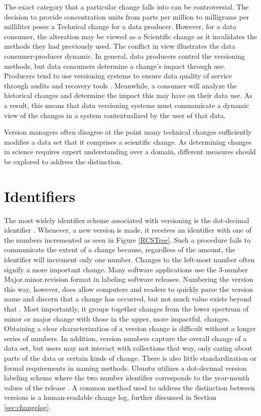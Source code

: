 The exact category that a particular change falls into can be controversial.
The decision to provide concentration units from parts per million to milligrams per milliliter poses a Technical change for a data producer.
However, for a data consumer, the alteration may be viewed as a Scientific change as it invalidates the methods they had previously used.
The conflict in view illustrates the data consumer-producer dynamic.
In general, data producers control the versioning methods, but data consumers determine a change's impact through use.
Producers tend to use versioning systems to ensure data quality of service through audits and recovery tools \cite{Cavanaugh2002}.
Meanwhile, a consumer will analyze the historical changes and determine the impact this may have on their data use.
As a result, this means that data versioning systems must communicate a dynamic view of the changes in a system contextualized by the user of that data.

Version managers often disagree at the point many technical changes sufficiently modifies a data set that it comprises a scientific change.
As determining changes in science requires expert understanding over a domain, different measures should be explored to address the distinction.

\section{Identifiers}

The most widely identifier scheme associated with versioning is the dot-decimal identifier \cite{Stuckenholz:2005:CEV:1039174.1039197}.
Whenever, a new version is made, it receives an identifier with one of the numbers incremented as seen in Figure \ref{RCSTree}.
Such a procedure fails to communicate the extent of a change because, regardless of the amount, the identifier will increment only one number.
Changes to the left-most number often signify a more important change.
Many software applications use the 3-number Major.minor.revision format in labeling software releases.
Numbering the version this way, however, does allow computers and readers to quickly parse the version name and discern that a change has occurred, but not much value exists beyond that \cite{Dijkstra1994}.
Most importantly, it groups together changes from the lower spectrum of minor or major change with those in the upper, more impactful, changes.
Obtaining a clear characterization of a version change is difficult without a longer series of numbers.
In addition, version numbers capture the overall change of a data set, but users may not interact with collections that way, only caring about parts of the data or certain kinds of change.
There is also little standardization or formal requirements in naming methods.
Ubuntu utilizes a dot-decimal version labeling scheme where the two number identifier corresponds to the year-month values of the release \cite{Ubuntu}.
A common method used to address the distinction between versions is a human-readable change log, further discussed in Section \ref{sec:changelog}.

